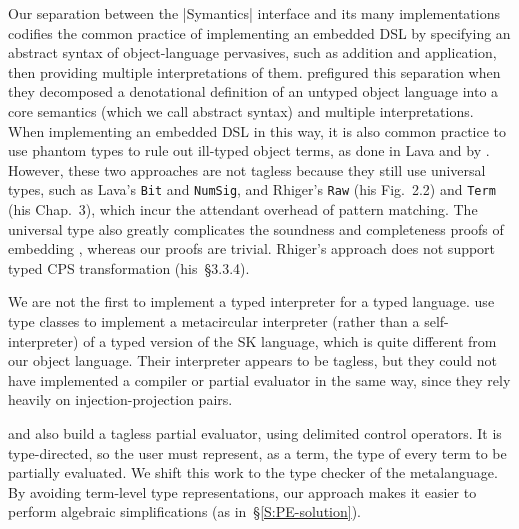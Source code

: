 Our separation between the |Symantics| interface and its many
implementations codifies the common practice of implementing an embedded
DSL by specifying an abstract syntax of object\hyp language pervasives,
such as addition and application, then providing multiple
interpretations of them.   prefigured this
separation when they decomposed a denotational definition of an untyped
object language into a core semantics (which we call abstract syntax)
and multiple interpretations.  When implementing an embedded DSL in this
way, it is also common practice to use phantom types to rule out
ill-typed object terms, as done in Lava
\citep{Lava} and by \citet{Rhiger-thesis}. However, these two approaches
are not tagless because they still use universal types, such as Lava's
\texttt{Bit} and \texttt{NumSig}, and Rhiger's \texttt{Raw} (his Fig.~2.2)
and \texttt{Term} (his Chap.~3), which incur the attendant overhead of
pattern matching.  The universal type also
greatly complicates the soundness and completeness proofs of embedding
\citep{Rhiger-thesis}, whereas our proofs are trivial.
Rhiger's approach does not support typed CPS transformation (his~\S3.3.4).
\begin{comment}
Rhiger's But Fig 2.2, p33: universal type Raw.  He uses phantom type
upon the Exp datatype. But that is cheating: phantom type means
essentially we can easily do coerce. We use real types.  That's why he
had to do tedious proofs in Sec 2 of soundness and completeness of
embedding. Whereas our proofs are obvious.  His sec 3 is based on data
representation of terms. They have type tags.  We do nothing of that
kind: See Sec 3.1.2. See numerous "data Term" in Sec3, which is the U
type.  In Sec 3.3.4 (p76) Rhiger specifically says that his encoding
cannot do typed CPS transformation -- whereas our does. BTW, Rhiger
thesis contains the definitions of the interpreter and the compiler,
in the beginning. Use this in response to Rev1)
\end{comment}


We are not the first to implement a typed interpreter for a typed
language.   use type classes to implement a metacircular
interpreter (rather than a self\hyp interpreter) of a
typed version of the SK language, which is quite different from our
object language.  Their interpreter
appears to be tagless, but they could not have implemented a
compiler or partial evaluator in the same way, since they rely
heavily on injection\hyp projection pairs.

 and \citet{balat:tdpe-popl2004} also build
a tagless partial evaluator, using delimited control operators.  It is
type-directed, so the user must represent, as a term, the type of every
term to be partially evaluated.  We shift this work to the type checker
of the metalanguage.  By avoiding term-level type representations, our
approach makes it easier to perform algebraic simplifications (as
in~\S\ref{S:PE-solution}).

